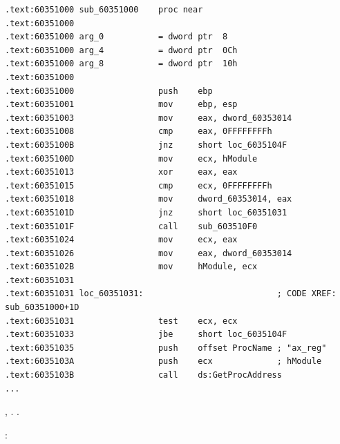 \begin{lstlisting}
.text:60351000 sub_60351000    proc near
.text:60351000
.text:60351000 arg_0           = dword ptr  8
.text:60351000 arg_4           = dword ptr  0Ch
.text:60351000 arg_8           = dword ptr  10h
.text:60351000
.text:60351000                 push    ebp
.text:60351001                 mov     ebp, esp
.text:60351003                 mov     eax, dword_60353014
.text:60351008                 cmp     eax, 0FFFFFFFFh
.text:6035100B                 jnz     short loc_6035104F
.text:6035100D                 mov     ecx, hModule
.text:60351013                 xor     eax, eax
.text:60351015                 cmp     ecx, 0FFFFFFFFh
.text:60351018                 mov     dword_60353014, eax
.text:6035101D                 jnz     short loc_60351031
.text:6035101F                 call    sub_603510F0
.text:60351024                 mov     ecx, eax
.text:60351026                 mov     eax, dword_60353014
.text:6035102B                 mov     hModule, ecx
.text:60351031
.text:60351031 loc_60351031:                           ; CODE XREF: sub_60351000+1D
.text:60351031                 test    ecx, ecx
.text:60351033                 jbe     short loc_6035104F
.text:60351035                 push    offset ProcName ; "ax_reg"
.text:6035103A                 push    ecx             ; hModule
.text:6035103B                 call    ds:GetProcAddress
...
\end{lstlisting}

,  . 
 .

:

